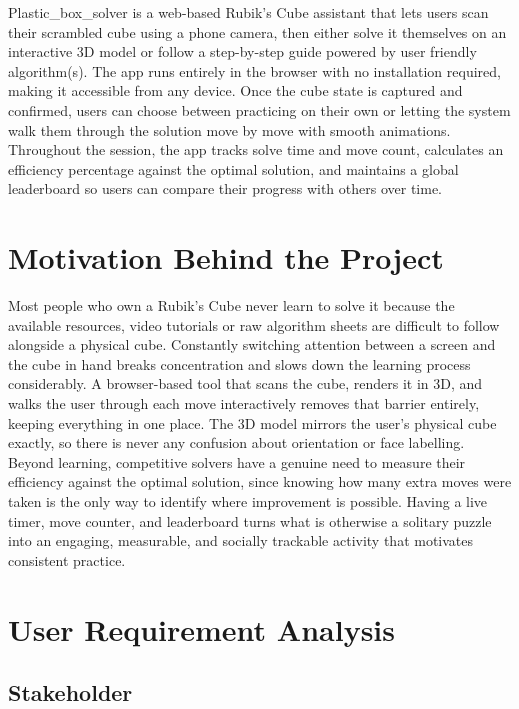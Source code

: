 \documentclass[12pt, a4paper]{article}
\begin{document}
Plastic\_box\_solver is a web-based Rubik's Cube assistant that lets users scan their scrambled cube using a phone camera, then either solve it themselves on an interactive 3D model or follow a step-by-step guide powered by user friendly algorithm(s). The app runs entirely in the browser with no installation required, making it accessible from any device. Once the cube state is captured and confirmed, users can choose between practicing on their own or letting the system walk them through the solution move by move with smooth animations. Throughout the session, the app tracks solve time and move count, calculates an efficiency percentage against the optimal solution, and maintains a global leaderboard so users can compare their progress with others over time.

\vspace{0.5cm}
\section{Motivation Behind the Project}

Most people who own a Rubik's Cube never learn to solve it because the available resources, video tutorials or raw algorithm sheets are difficult to follow alongside a physical cube. Constantly switching attention between a screen and the cube in hand breaks concentration and slows down the learning process considerably. A browser-based tool that scans the cube, renders it in 3D, and walks the user through each move interactively removes that barrier entirely, keeping everything in one place. The 3D model mirrors the user's physical cube exactly, so there is never any confusion about orientation or face labelling. Beyond learning, competitive solvers have a genuine need to measure their efficiency against the optimal solution, since knowing how many extra moves were taken is the only way to identify where improvement is possible. Having a live timer, move counter, and leaderboard turns what is otherwise a solitary puzzle into an engaging, measurable, and socially trackable activity that motivates consistent practice.



\vspace{0.5cm}
\newpage
\section{User Requirement Analysis}

\subsection*{Stakeholder}
\end{document}
